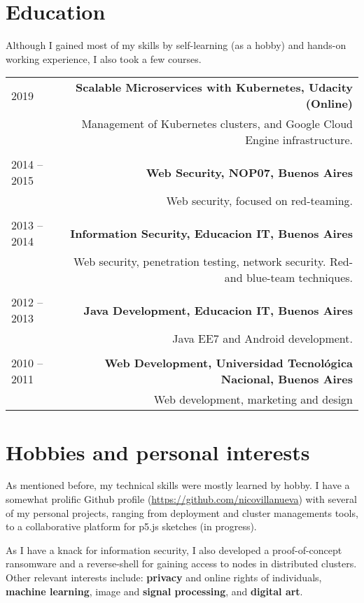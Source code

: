 \documentclass{vitae}
\begin{document}
\newpage

\section*{Education}
Although I gained most of my skills by self-learning (as a hobby) and hands-on working experience, I also took a few courses.

\begin{tabular}{L!{\VRule}R}
2019&{\bf Scalable Microservices with Kubernetes, Udacity (Online)}\\
&Management of Kubernetes clusters, and Google Cloud Engine infrastructure.\\
\\
2014 -- 2015&{\bf Web Security, NOP07, Buenos Aires}\\
&Web security, focused on red-teaming.\\
\\
2013 -- 2014&{\bf Information Security, Educacion IT, Buenos Aires}\\
&Web security, penetration testing, network security. Red- and blue-team techniques.\\
\\
2012 -- 2013&{\bf Java Development, Educacion IT, Buenos Aires}\\
&Java EE7 and Android development.\\
\\
2010 -- 2011&{\bf Web Development, Universidad Tecnológica Nacional, Buenos Aires}\\
&Web development, marketing and design\\

\end{tabular}

\section*{Hobbies and personal interests}
As mentioned before, my technical skills were mostly learned by hobby. I have a somewhat prolific Github profile (\url{https://github.com/nicovillanueva}) with several of my personal projects, ranging from deployment and cluster managements tools, to a collaborative platform for p5.js sketches (in progress).

As I have a knack for information security, I also developed a proof-of-concept ransomware and a reverse-shell for gaining access to nodes in distributed clusters.
Other relevant interests include: {\bf privacy} and online rights of individuals, {\bf machine learning}, image and {\bf signal processing}, and {\bf digital art}.
\end{document}
